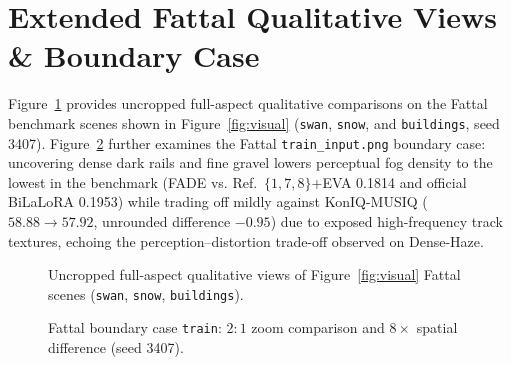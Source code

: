 \documentclass[10pt,twocolumn,letterpaper]{article}
\begin{document}
\section{Extended Fattal Qualitative Views \& Boundary Case}
Figure~\ref{fig:fullphotos} provides uncropped full-aspect qualitative comparisons on the Fattal benchmark scenes shown in Figure~\ref{fig:visual} (\texttt{swan}, \texttt{snow}, and \texttt{buildings}, seed 3407). Figure~\ref{fig:traincase} further examines the Fattal \texttt{train\_input.png} boundary case: uncovering dense dark rails and fine gravel lowers perceptual fog density to the lowest in the benchmark (FADE  vs. Ref.~\(\{1,7,8\}\)+EVA 0.1814 and official BiLaLoRA 0.1953) while trading off mildly against KonIQ-MUSIQ ($58.88 \to 57.92$, unrounded difference $-0.95$) due to exposed high-frequency track textures, echoing the perception--distortion trade-off observed on Dense-Haze.

\begin{figure}[H]\centering
\caption{Uncropped full-aspect qualitative views of Figure~\ref{fig:visual} Fattal scenes (\texttt{swan}, \texttt{snow}, \texttt{buildings}).}
\label{fig:fullphotos}
\end{figure}

\begin{figure}[H]\centering
\caption{Fattal boundary case \texttt{train}: $2:1$ zoom comparison and $8\times$ spatial difference (seed 3407).}
\label{fig:traincase}
\end{figure}
\end{document}
